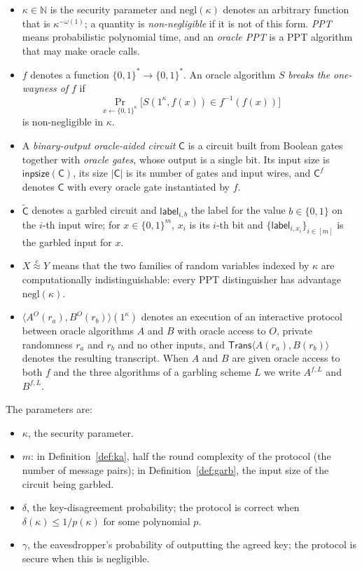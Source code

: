 \documentclass{aicr-conjecture}
\newcommand{\bits}{\{0,1\}}
\newcommand{\Cc}{\mathsf{C}}
\newcommand{\Ct}{\widetilde{\mathsf{C}}}
\newcommand{\lab}{\mathsf{label}}
\newcommand{\labset}[1]{\{\lab_{i,#1}\}}
\newcommand{\inpsize}{\mathsf{inpsize}}
\newcommand{\Trans}{\mathsf{Trans}}
\newcommand{\negl}{\mathrm{negl}}
\newcommand{\cind}{\stackrel{c}{\approx}}
\begin{document}
\begin{itemize}
\item $\kappa\in\mathbb{N}$ is the security parameter and $\negl(\kappa)$
  denotes an arbitrary function that is $\kappa^{-\omega(1)}$; a quantity
  is \emph{non-negligible} if it is not of this form. \emph{PPT} means
  probabilistic polynomial time, and an \emph{oracle PPT} is a PPT
  algorithm that may make oracle calls.
\item $f$ denotes a function $\bits^{*}\to\bits^{*}$. An oracle algorithm
  $S$ \emph{breaks the one-wayness of} $f$ if
  \[
    \Pr_{x\leftarrow\bits^{\kappa}}
      \bigl[S(1^{\kappa},f(x))\in f^{-1}(f(x))\bigr]
  \]
  is non-negligible in $\kappa$.
\item A \emph{binary-output oracle-aided circuit} $\Cc$ is a circuit built
  from Boolean gates together with \emph{oracle gates}, whose output is a
  single bit. Its input size is $\inpsize(\Cc)$, its size $|\Cc|$ is its
  number of gates and input wires, and $\Cc^{f}$ denotes $\Cc$ with every
  oracle gate instantiated by $f$.
\item $\Ct$ denotes a garbled circuit and $\lab_{i,b}$ the label for the
  value $b\in\bits$ on the $i$-th input wire; for $x\in\bits^{m}$, $x_i$
  is its $i$-th bit and $\labset{x_i}_{i\in[m]}$ is the garbled input
  for $x$.
\item $X\cind Y$ means that the two families of random variables indexed
  by $\kappa$ are computationally indistinguishable: every PPT
  distinguisher has advantage $\negl(\kappa)$.
\item $\langle A^{O}(r_a),B^{O}(r_b)\rangle(1^{\kappa})$ denotes an
  execution of an interactive protocol between oracle algorithms $A$ and
  $B$ with oracle access to $O$, private randomness $r_a$ and $r_b$ and no
  other inputs, and $\Trans\langle A(r_a),B(r_b)\rangle$ denotes the
  resulting transcript. When $A$ and $B$ are given oracle access to both
  $f$ and the three algorithms of a garbling scheme $L$ we write $A^{f,L}$
  and $B^{f,L}$.
\end{itemize}

The parameters are:
\begin{itemize}
\item $\kappa$, the security parameter.
\item $m$: in Definition~\ref{def:ka}, half the round complexity of the
  protocol (the number of message pairs); in
  Definition~\ref{def:garb}, the input size of the circuit being garbled.
\item $\delta$, the key-disagreement probability; the protocol is correct
  when $\delta(\kappa)\le 1/p(\kappa)$ for some polynomial $p$.
\item $\gamma$, the eavesdropper's probability of outputting the agreed
  key; the protocol is secure when this is negligible.
\end{itemize}
\end{document}
